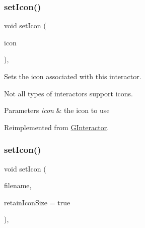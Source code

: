 \mbox{\label{classsgl_1_1GButton_acb5275b880ff622d306f8f33428b4e34}} 
\subsubsection{\texorpdfstring{set\+Icon()}{setIcon()}\hspace{0.1cm}{\footnotesize\ttfamily [2/3]}}
{\footnotesize\ttfamily void set\+Icon (\begin{DoxyParamCaption}\item[{const Q\+Pixmap \&}]{icon }\end{DoxyParamCaption})\hspace{0.3cm}{\ttfamily [override]}, {\ttfamily [virtual]}}



Sets the icon associated with this interactor. 

Not all types of interactors support icons. 
\begin{DoxyParams}{Parameters}
{\em icon} & the icon to use \\
\hline
\end{DoxyParams}


Reimplemented from \mbox{\hyperlink{classsgl_1_1GInteractor_a368e1a338f84401c284506d03b1ba769}{G\+Interactor}}.

\mbox{\label{classsgl_1_1GButton_abbefcb1f611af273755c7e1cca921497}} 
\subsubsection{\texorpdfstring{set\+Icon()}{setIcon()}\hspace{0.1cm}{\footnotesize\ttfamily [3/3]}}
{\footnotesize\ttfamily void set\+Icon (\begin{DoxyParamCaption}\item[{const std\+::string \&}]{filename,  }\item[{bool}]{retain\+Icon\+Size = {\ttfamily true} }\end{DoxyParamCaption})\hspace{0.3cm}{\ttfamily [override]}, {\ttfamily [virtual]}}




